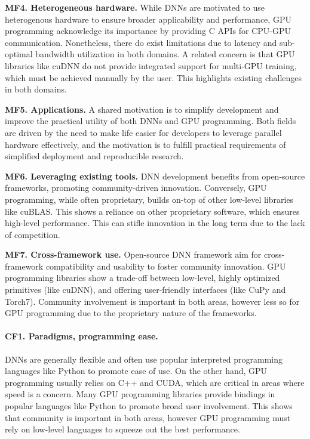 \textbf{MF4. Heterogeneous hardware.}
While DNNs are motivated to use heterogenous hardware to ensure broader applicability and performance, GPU programming
acknowledge its importance by providing C APIs for CPU-GPU communication. Nonetheless, there do exist limitations
due to latency and sub-optimal bandwidth utilization in both domains. A related concern is that GPU libraries like cuDNN do not provide
integrated support for multi-GPU training, which must be achieved manually by the user. This highlights existing challenges
in both domains.

\textbf{MF5. Applications.}
A shared motivation is to simplify development and improve the practical utility of both DNNs and GPU programming.
Both fields are driven by the need to make life easier for developers to leverage parallel hardware effectively,
and the motivation is to fulfill practical requirements of simplified deployment and reproducible research.

\textbf{MF6. Leveraging existing tools.}
DNN development benefits from open-source frameworks, promoting community-driven innovation. Conversely, GPU programming,
while often proprietary, builds on-top of other low-level libraries like cuBLAS. This shows a reliance on other
proprietary software, which ensures high-level performance. This can stifle innovation in the long term due
to the lack of competition.

\textbf{MF7. Cross-framework use.}
Open-source DNN framework aim for cross-framework compatibility and usability to foster community innovation.
GPU programming libraries show a trade-off between low-level, highly optimized primitives (like cuDNN), and offering
user-friendly interfaces (like CuPy and Torch7). Community involvement is important in both areas, however
less so for GPU programming due to the proprietary nature of the frameworks.

\paragraph{CF1. Paradigms, programming ease.}
DNNs are generally flexible and often use popular interpreted programming languages like Python to
promote ease of use. On the other hand, GPU programming usually relies on C++ and CUDA, which are
critical in areas where speed is a concern. Many GPU programming libraries provide bindings in
popular languages like Python to promote broad user involvement. This shows that community is
important in both areas, however GPU programming must rely on low-level languages to squeeze out
the best performance.

